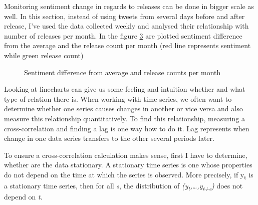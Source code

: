 Monitoring sentiment change in regards to releases can be done in bigger scale as well. In this section, instead of using tweets from several days before and after release, I've used the data collected weekly and analysed their relationship with number of releases per month. In the figure \ref{fig:ReleasesSentiment3} are plotted sentiment difference from the average and the release count per month (red line represents sentiment while green release count)

\begin{figure}[H]%
    \centering
    \qquad
    \label{fig:ReleasesSentiment1}%
\end{figure}


\begin{figure}[H]%
    \centering
    \qquad
    \label{fig:ReleasesSentiment2}%
\end{figure}


\begin{figure}[H]%
    \centering
    \qquad
        \caption{Sentiment difference from average and release counts per month}
    \label{fig:ReleasesSentiment3}%
\end{figure}

Looking at linecharts can give us some feeling and intuition whether and what type of relation there is. When working with time series, we often want to determine whether one series causes changes in another or vice versa and also measure this relationship quantitatively. To find this relationship, measuring a cross-correlation and finding a lag is one way how to do it. Lag represents when change in one data series transfers to the other several periods later. 

To ensure a cross-correlation calculation makes sense, first I have to determine, whether are the data stationary. A stationary time series is one whose properties do not depend on the time at which the series is observed\cite{hyndman5forecast}. More precisely, if y\textsubscript{t} is a stationary time series, then for all \textit{s}, the distribution of \textit{(y\textsubscript{t},…,y\textsubscript{t+s})} does not depend on \textit{t}.

